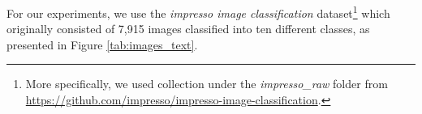 

For our experiments, we use the \textit{impresso image classification} 
dataset\footnote{More specifically, we used collection under the \textit{impresso\_raw} folder from \url{https://github.com/impresso/impresso-image-classification}.} which originally consisted of 7,915 images classified into ten different classes, as presented in Figure \ref{tab:images_text}. 




